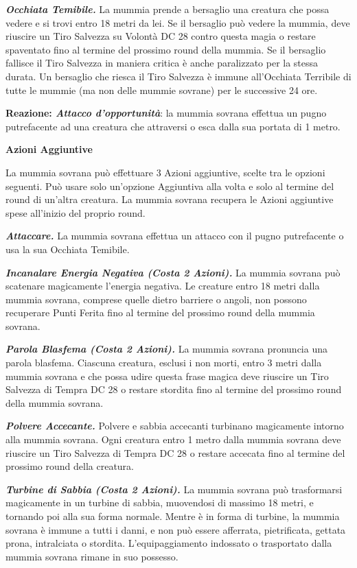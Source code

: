 \begin{multicols}{2}
{\emph{\textbf{Occhiata Temibile.}} La mummia prende a bersaglio una creatura che possa vedere e si trovi entro 18 metri da lei. Se il bersaglio può vedere la mummia, deve riuscire un Tiro Salvezza su Volontà DC 28 contro questa magia o restare spaventato fino al termine del prossimo round della mummia. Se il bersaglio fallisce il Tiro Salvezza in maniera critica è anche paralizzato per la stessa durata. Un bersaglio che riesca il Tiro Salvezza è immune all'Occhiata Terribile di tutte le mummie (ma non delle mummie sovrane) per le successive 24 ore.

\textbf{Reazione: \emph{Attacco d'opportunità}}: la mummia sovrana effettua un pugno putrefacente ad una creatura che attraversi o esca dalla sua portata di 1 metro.

\textbf{Azioni Aggiuntive}

La mummia sovrana può effettuare 3 Azioni aggiuntive, scelte tra le opzioni seguenti. Può usare solo un'opzione Aggiuntiva alla volta e solo al termine del round di un'altra creatura. La mummia sovrana recupera le Azioni aggiuntive spese all'inizio del proprio round.

\emph{\textbf{Attaccare.}} La mummia sovrana effettua un attacco con il pugno putrefacente o usa la sua Occhiata Temibile.

\emph{\textbf{Incanalare Energia Negativa (Costa 2 Azioni).}} La mummia sovrana può scatenare magicamente l'energia negativa. Le creature entro 18 metri dalla mummia sovrana, comprese quelle dietro barriere o angoli, non possono recuperare Punti Ferita fino al termine del prossimo round della mummia sovrana.

\emph{\textbf{Parola Blasfema (Costa 2 Azioni).}} La mummia sovrana pronuncia una parola blasfema. Ciascuna creatura, esclusi i non morti, entro 3 metri dalla mummia sovrana e che possa udire questa frase magica deve riuscire un Tiro Salvezza di Tempra DC 28 o restare stordita fino al termine del prossimo round della mummia sovrana.

\emph{\textbf{Polvere Accecante.}} Polvere e sabbia accecanti turbinano magicamente intorno alla mummia sovrana. Ogni creatura entro 1 metro dalla mummia sovrana deve riuscire un Tiro Salvezza di Tempra DC 28 o restare accecata fino al termine del prossimo round della creatura.

\emph{\textbf{Turbine di Sabbia (Costa 2 Azioni).}} La mummia sovrana può trasformarsi magicamente in un turbine di sabbia, muovendosi di massimo 18 metri, e tornando poi alla sua forma normale. Mentre è in forma di turbine, la mummia sovrana è immune a tutti i danni, e non può essere afferrata, pietrificata, gettata prona, intralciata o stordita. L'equipaggiamento indossato o trasportato dalla mummia sovrana rimane in suo possesso.

}
\end{multicols}
